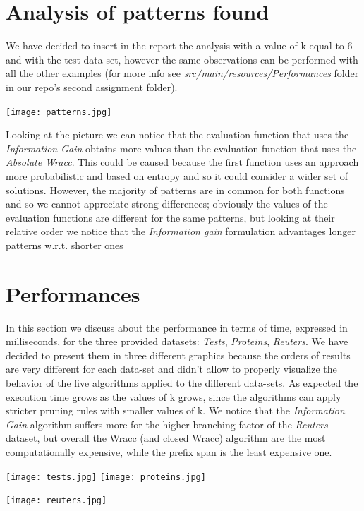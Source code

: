 \documentclass[10pt, a4paper]{article}
\begin{document}
	\section{Analysis of patterns found}
	We have decided to insert in the report the analysis with a value of k equal to 6 and with the test data-set, however the same observations can be performed with all the other examples (for more info see\textit{ src/main/resources/Performances} folder in our repo's second assignment folder).
	\begin{center}
	\texttt{[image: patterns.jpg]}\par\vspace{1cm}
	\end{center}
	\noindent
	Looking at the picture we can notice that the evaluation function that uses the \textit{Information Gain} obtains more values than the evaluation function that uses the \textit{Absolute Wracc}. This could be caused because the first function uses an approach more probabilistic and based on entropy and so it could consider a wider set of solutions.
	However, the majority of patterns are in common for both functions and so we cannot appreciate strong differences; obviously the values of the evaluation functions are different for the same patterns, but looking at their relative order we notice that the \textit{Information gain} formulation advantages longer patterns w.r.t. shorter ones
	\section{Performances}
	In this section we discuss about the performance in terms of time, expressed in milliseconds, for the three provided datasets: \textit{Tests}, \textit{Proteins}, \textit{Reuters}. 
	We have decided to present them in three different graphics because the orders of results are very different for each data-set and didn't allow to properly visualize the behavior of the five algorithms applied to the different data-sets.
	As expected the execution time grows as the values of k grows, since the algorithms can apply stricter pruning rules with smaller values of k.\newline
	We notice that the \textit{Information Gain} algorithm suffers more for the higher branching factor of the \textit{Reuters} dataset, but overall the Wracc (and closed Wracc) algorithm are the most computationally expensive, while the prefix span is the least expensive one.

	\begin{multicols}{2}
	\texttt{[image: tests.jpg]}
	\texttt{[image: proteins.jpg]}	
    \end{multicols}
	\begin{center}
	\texttt{[image: reuters.jpg]}
	\end{center}
\end{document}
